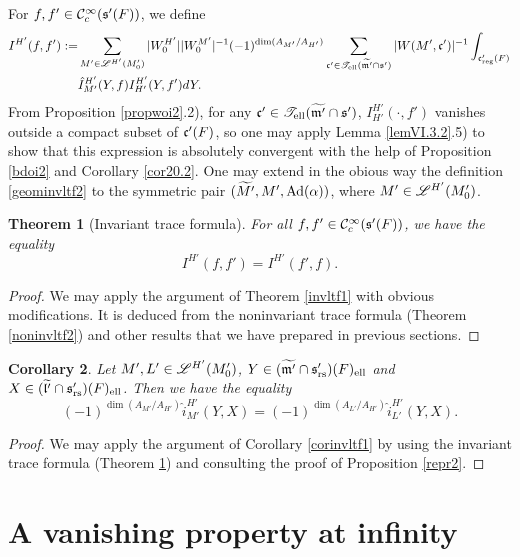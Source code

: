 \documentclass[a4paper]{amsart}
\newcommand{\fm}{{\mathfrak{m}}} \newcommand{\fn}{{\mathfrak{n}}}\newcommand{\fo}{{\mathfrak{o}}} \newcommand{\fp}{{\mathfrak{p}}}
\newcommand{\wt}{\widetilde}                        \newcommand{\wh}{\widehat}                      \newcommand{\wpair}[1]{\left\{{#1}\right\}}
\newtheorem{thm}{Theorem}[section]
\newtheorem{coro}[thm]{Corollary}
\theoremstyle{definition}
\theoremstyle{remark}
\numberwithin{equation}{subsection}
\begin{document}
For $f, f'\in{\mathcal {C}}_c^\infty({\mathfrak{s}}'(F))$, we define
\begin{equation}\label{geominvltf2}
\begin{split}
 I^{H'}(f, f'):=&\sum_{M'\in\msl^{H'}(M'_0)} |W_0^{H'}||W_0^{M'}|^{-1} (-1)^{\dim(A_{M'}/A_{H'})} \sum_{\fc'\in\mst_\el(\wt{\fm'}\cap\fs')} |W(M', \fc')|^{-1} \int_{\fc'_\reg(F)} \\
 &\hat{I}_{M'}^{H'}(Y, f) I_{H'}^{H'}(Y, f') dY. 
\end{split}
\end{equation}
From Proposition \ref{propwoi2}.2), for any $\fc'\in\mst_\el(\wt{\fm'}\cap\fs')$, $I_{H'}^{H'}(\cdot, f')$ vanishes outside a compact subset of ${\mathfrak{c}}'(F)$, so one may apply Lemma \ref{lemVI.3.2}.5) to show that this expression is absolutely convergent with the help of Proposition \ref{bdoi2} and Corollary \ref{cor20.2}. One may extend in the obious way the definition \eqref{geominvltf2} to the symmetric pair $(\wt{M'}, M', \Ad(\alpha))$, where $M'\in\mathscr{L}^{H'}(M'_0)$. 

\begin{thm}[Invariant trace formula]\label{invltf2}
For all $f, f'\in{\mathcal {C}}_c^\infty({\mathfrak{s}}'(F))$, we have the equality
$$ I^{H'}(f, f')=I^{H'}(f', f). $$
\end{thm}

\begin{proof}
We may apply the argument of Theorem \ref{invltf1} with obvious modifications. It is deduced from the noninvariant trace formula (Theorem \ref{noninvltf2}) and other results that we have prepared in previous sections. 
\end{proof}

\begin{coro}\label{corinvltf2}
Let $M', L'\in\mathscr{L}^{H'}(M'_0)$, $Y\in(\wt{\fm'}\cap\fs'_\rs)(F)_\el$ and $X\in(\wt{\fl'}\cap\fs'_\rs)(F)_\el$. Then we have the equality
$$ (-1)^{\dim(A_{M'}/A_{H'})} \hat{i}_{M'}^{H'}(Y, X)=(-1)^{\dim(A_{L'}/A_{H'})} \hat{i}_{L'}^{H'}(Y, X). $$
\end{coro}

\begin{proof}
We may apply the argument of Corollary \ref{corinvltf1} by using the invariant trace formula (Theorem \ref{invltf2}) and consulting the proof of Proposition \ref{repr2}. 
\end{proof}





\section{\textbf{A vanishing property at infinity}}\label{secvanpro}
\end{document}
